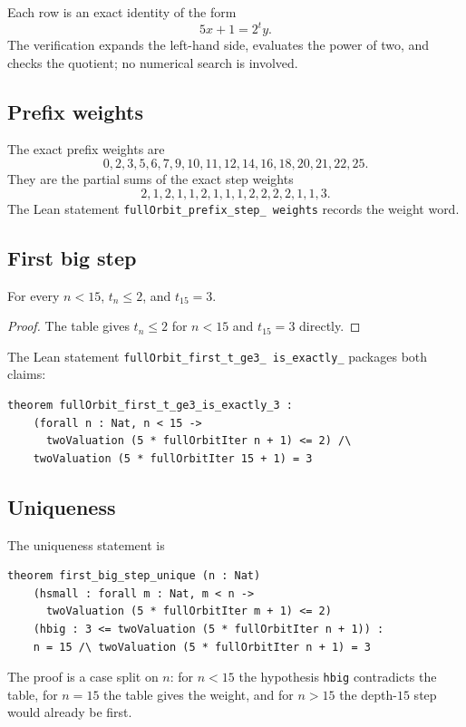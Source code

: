 Each row is an exact identity of the form
\begin{equation*}
  5x+1=2^t y.
\end{equation*}
The verification expands the left-hand side, evaluates the power of
two, and checks the quotient; no numerical search is involved.

\subsection{Prefix weights}

The exact prefix weights are
\begin{equation*}
  0,2,3,5,6,7,9,10,11,12,14,16,18,20,21,22,25.
\end{equation*}
They are the partial sums of the exact step weights
\begin{equation*}
  2,1,2,1,1,2,1,1,1,2,2,2,2,1,1,3.
\end{equation*}
The Lean statement
\texttt{fullOrbit\_\allowbreak prefix\_\allowbreak step\_\allowbreak
weights} records the weight word.

\subsection{First big step}

\begin{lemma}
For every $n<15$, $t_n\le2$, and $t_{15}=3$.
\end{lemma}

\begin{proof}
The table gives $t_n\le2$ for $n<15$ and $t_{15}=3$ directly.
\end{proof}

The Lean statement
\texttt{fullOrbit\_\allowbreak first\_\allowbreak t\_\allowbreak ge3\_
\allowbreak is\_\allowbreak exactly\_} packages both
claims:
\begin{verbatim}
theorem fullOrbit_first_t_ge3_is_exactly_3 :
    (forall n : Nat, n < 15 ->
      twoValuation (5 * fullOrbitIter n + 1) <= 2) /\
    twoValuation (5 * fullOrbitIter 15 + 1) = 3
\end{verbatim}

\subsection{Uniqueness}

The uniqueness statement is
\begin{verbatim}
theorem first_big_step_unique (n : Nat)
    (hsmall : forall m : Nat, m < n ->
      twoValuation (5 * fullOrbitIter m + 1) <= 2)
    (hbig : 3 <= twoValuation (5 * fullOrbitIter n + 1)) :
    n = 15 /\ twoValuation (5 * fullOrbitIter n + 1) = 3
\end{verbatim}
The proof is a case split on $n$: for $n<15$ the hypothesis
\texttt{hbig} contradicts the table, for $n=15$ the table gives the
weight, and for $n>15$ the depth-$15$ step would already be first.

